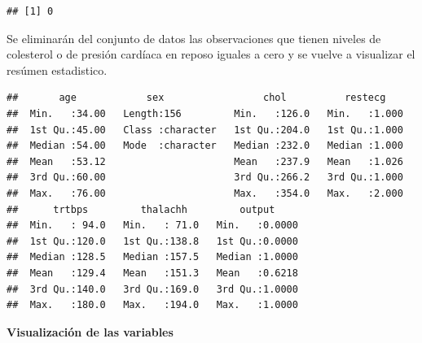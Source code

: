 \documentclass[
]{article}
\newenvironment{Shaded}{\begin{snugshade}}{\end{snugshade}}
\newcommand{\CommentTok}[1]{\textcolor[rgb]{0.56,0.35,0.01}{\textit{#1}}}
\newcommand{\DecValTok}[1]{\textcolor[rgb]{0.00,0.00,0.81}{#1}}
\newcommand{\FunctionTok}[1]{\textcolor[rgb]{0.13,0.29,0.53}{\textbf{#1}}}
\newcommand{\NormalTok}[1]{#1}
\newcommand{\OtherTok}[1]{\textcolor[rgb]{0.56,0.35,0.01}{#1}}
\newcommand{\SpecialCharTok}[1]{\textcolor[rgb]{0.81,0.36,0.00}{\textbf{#1}}}
\begin{document}
\begin{Shaded}
\end{Shaded}

\begin{verbatim}
## [1] 0
\end{verbatim}

Se eliminarán del conjunto de datos las observaciones que tienen niveles
de colesterol o de presión cardíaca en reposo iguales a cero y se vuelve
a visualizar el resúmen estadistico.

\begin{Shaded}
\end{Shaded}

\begin{verbatim}
##       age            sex                 chol          restecg     
##  Min.   :34.00   Length:156         Min.   :126.0   Min.   :1.000  
##  1st Qu.:45.00   Class :character   1st Qu.:204.0   1st Qu.:1.000  
##  Median :54.00   Mode  :character   Median :232.0   Median :1.000  
##  Mean   :53.12                      Mean   :237.9   Mean   :1.026  
##  3rd Qu.:60.00                      3rd Qu.:266.2   3rd Qu.:1.000  
##  Max.   :76.00                      Max.   :354.0   Max.   :2.000  
##      trtbps         thalachh         output      
##  Min.   : 94.0   Min.   : 71.0   Min.   :0.0000  
##  1st Qu.:120.0   1st Qu.:138.8   1st Qu.:0.0000  
##  Median :128.5   Median :157.5   Median :1.0000  
##  Mean   :129.4   Mean   :151.3   Mean   :0.6218  
##  3rd Qu.:140.0   3rd Qu.:169.0   3rd Qu.:1.0000  
##  Max.   :180.0   Max.   :194.0   Max.   :1.0000
\end{verbatim}

\textbf{Visualización de las variables}
\end{document}
